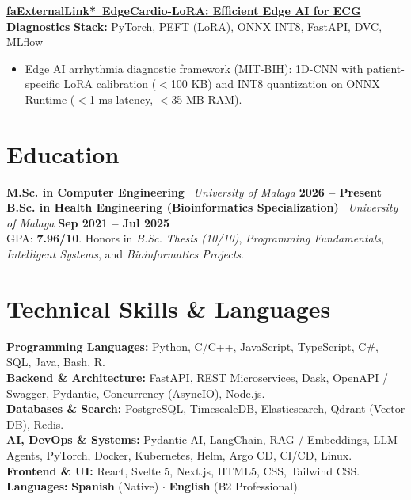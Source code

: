\documentclass[a4paper,10pt]{article}
\begin{document}
\vspace{4.5pt}

\noindent\textbf{\href{https://diegodepablo.is-a.dev/projects/edgecardio-lora}{\csname faExternalLink*\endcsname\ EdgeCardio-LoRA: Efficient Edge AI for ECG Diagnostics}} \hfill {\scriptsize\color{subtext}\textbf{Stack:} PyTorch, PEFT (LoRA), ONNX INT8, FastAPI, DVC, MLflow}
\begin{itemize}
  \item Edge AI arrhythmia diagnostic framework (MIT-BIH): 1D-CNN with patient-specific LoRA calibration ($<$100 KB) and INT8 quantization on ONNX Runtime ($<$1 ms latency, $<$35 MB RAM).
\end{itemize}

\section*{Education}

\noindent\textbf{M.Sc. in Computer Engineering} \textbar\ \textit{University of Malaga} \hfill {\footnotesize\color{subtext}\textbf{2026 -- Present}} \\[2.5pt]
\noindent\textbf{B.Sc. in Health Engineering (Bioinformatics Specialization)} \textbar\ \textit{University of Malaga} \hfill {\footnotesize\color{subtext}\textbf{Sep 2021 -- Jul 2025}} \\
{\footnotesize GPA: \textbf{7.96/10}. Honors in \textit{B.Sc. Thesis (10/10)}, \textit{Programming Fundamentals}, \textit{Intelligent Systems}, and \textit{Bioinformatics Projects}.}

\section*{Technical Skills \& Languages}

{\footnotesize
\noindent\textbf{Programming Languages:} Python, C/C++, JavaScript, TypeScript, C\#, SQL, Java, Bash, R. \\[2.5pt]
\textbf{Backend \& Architecture:} FastAPI, REST Microservices, Dask, OpenAPI / Swagger, Pydantic, Concurrency (AsyncIO), Node.js. \\[2.5pt]
\textbf{Databases \& Search:} PostgreSQL, TimescaleDB, Elasticsearch, Qdrant (Vector DB), Redis. \\[2.5pt]
\textbf{AI, DevOps \& Systems:} Pydantic AI, LangChain, RAG / Embeddings, LLM Agents, PyTorch, Docker, Kubernetes, Helm, Argo CD, CI/CD, Linux. \\[2.5pt]
\textbf{Frontend \& UI:} React, Svelte 5, Next.js, HTML5, CSS, Tailwind CSS. \hfill \textbf{Languages:} \textbf{Spanish} (Native) \enskip $\cdot$ \enskip \textbf{English} (B2 Professional).
}
\end{document}
